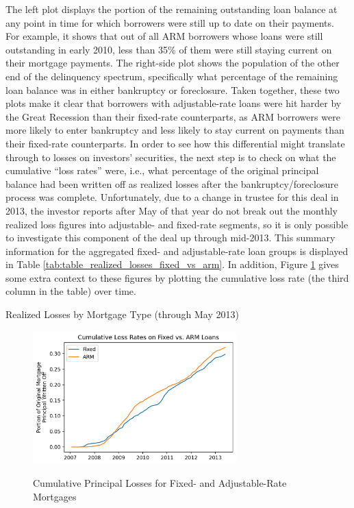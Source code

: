 \documentclass[12pt]{article}
\begin{document}
The left plot displays the portion of the remaining outstanding loan balance at any point in time for which borrowers were still up to date on their payments. For example, it shows that out of all ARM borrowers whose loans were still outstanding in early 2010, less than 35\% of them were still staying current on their mortgage payments. The right-side plot shows the population of the other end of the delinquency spectrum, specifically what percentage of the remaining loan balance was in either bankruptcy or foreclosure. Taken together, these two plots make it clear that borrowers with adjustable-rate loans were hit harder by the Great Recession than their fixed-rate counterparts, as ARM borrowers were more likely to enter bankruptcy and less likely to stay current on payments than their fixed-rate counterparts. In order to see how this differential might translate through to losses on investors’ securities, the next step is to check on what the cumulative “loss rates” were, i.e., what percentage of the original principal balance had been written off as realized losses after the bankruptcy/foreclosure process was complete. Unfortunately, due to a change in trustee for this deal in 2013, the investor reports after May of that year do not break out the monthly realized loss figures into adjustable- and fixed-rate segments, so it is only possible to investigate this component of the deal up through mid-2013. This summary information for the aggregated fixed- and adjustable-rate loan groups is displayed in Table \ref{tab:table_realized_losses_fixed_vs_arm}. In addition, Figure \ref{fig:timeseries_cumulative_losses_fixed_vs_arm} gives some extra context to these figures by plotting the cumulative loss rate (the third column in the table) over time.

\begin{table}[h]
	\centering
	
	\caption{Realized Losses by Mortgage Type (through May 2013)}
	\label{tab:table_realized_losses_fixed_vs_arm}
\end{table}

\begin{figure}[h]
	\centering
	\caption{Cumulative Principal Losses for Fixed- and Adjustable-Rate Mortgages}
	\includegraphics[width=0.7\textwidth]{../figures/timeseries_cumulative_losses_fixed_vs_arm}
	\label{fig:timeseries_cumulative_losses_fixed_vs_arm}
\end{figure}
\end{document}
